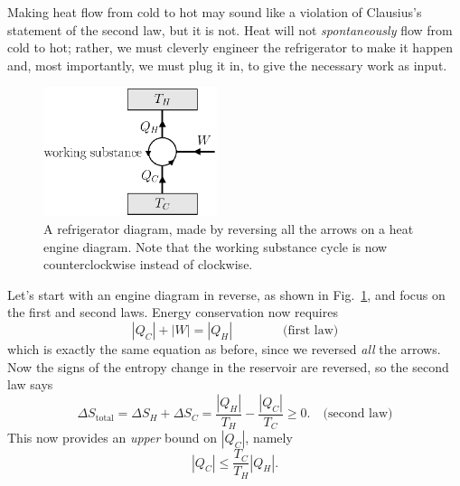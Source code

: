 Making heat flow from cold to hot may sound like a violation of
Clausius's statement of the second law, but it is not.  Heat will not
{\it spontaneously} flow from cold to hot; rather, we must cleverly
engineer the refrigerator to make it happen and, most importantly, we
must plug it in, to give the necessary work as input.

\begin{figure}
\begin{center}
\includegraphics[width=2in]{heat_engines/refrigerator_diagram.eps}
\caption{A refrigerator diagram, made by reversing all the arrows on a
  heat engine diagram.  Note that the working substance cycle is now
  counterclockwise instead of clockwise.}
\label{fig:refrigerator_diagram}
\end{center}
\end{figure}

Let's start with an engine diagram in reverse, as shown in
Fig.~\ref{fig:refrigerator_diagram}, and focus on the first and second
laws.  Energy conservation now requires
\begin{equation}
|Q_C| + |W| = |Q_H| \qquad\qquad\text{(first law)}
\end{equation}
which is exactly the same equation as before, since we reversed {\it
  all} the arrows.  Now the signs of the entropy change in the
reservoir are reversed, so the second law says
\begin{equation}
\Delta S_\text{total} = \Delta S_H + \Delta S_C = 
 \frac{|Q_H|}{T_H} - \frac{|Q_C|}{T_C} \geq 0.\quad\text{(second law)}
\end{equation}
 This now provides an {\it upper} bound on $|Q_C|$, namely
\begin{equation}
|Q_C| \leq \frac{T_C}{T_H}|Q_H|.
\label{eq:qc_upper_bound}
\end{equation}

